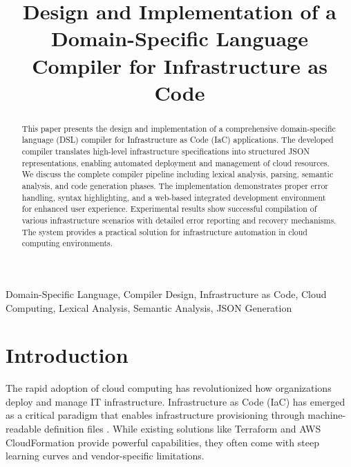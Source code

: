 \documentclass[journal,twocolumn,10pt]{IEEEtran}
\begin{document}
\title{Design and Implementation of a Domain-Specific Language Compiler for Infrastructure as Code}

\author{
}

\maketitle

\begin{abstract}
This paper presents the design and implementation of a comprehensive domain-specific language (DSL) compiler for Infrastructure as Code (IaC) applications. The developed compiler translates high-level infrastructure specifications into structured JSON representations, enabling automated deployment and management of cloud resources. We discuss the complete compiler pipeline including lexical analysis, parsing, semantic analysis, and code generation phases. The implementation demonstrates proper error handling, syntax highlighting, and a web-based integrated development environment for enhanced user experience. Experimental results show successful compilation of various infrastructure scenarios with detailed error reporting and recovery mechanisms. The system provides a practical solution for infrastructure automation in cloud computing environments.
\end{abstract}

\begin{IEEEkeywords}
Domain-Specific Language, Compiler Design, Infrastructure as Code, Cloud Computing, Lexical Analysis, Semantic Analysis, JSON Generation
\end{IEEEkeywords}

\section{Introduction}

The rapid adoption of cloud computing has revolutionized how organizations deploy and manage IT infrastructure. Infrastructure as Code (IaC) has emerged as a critical paradigm that enables infrastructure provisioning through machine-readable definition files \cite{iac_overview}. While existing solutions like Terraform and AWS CloudFormation provide powerful capabilities, they often come with steep learning curves and vendor-specific limitations.
\end{document}

